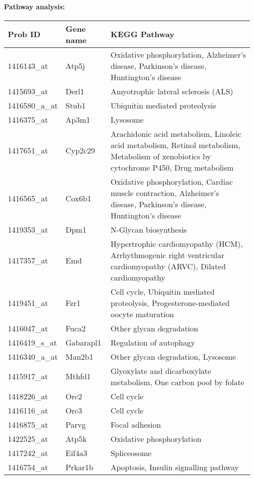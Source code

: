 \paragraph{Pathway analysis:}
\begin{table}
    \begin{tabularx}{0.99\textwidth}{ l l X }
    \toprule
	Prob ID & Gene name	& KEGG Pathway \\
    \midrule
	1416143_at &	Atp5j 	& Oxidative phosphorylation, Alzheimer's disease, Parkinson's disease, Huntington's disease\\
	1415693_at &	Derl1 	& Amyotrophic lateral sclerosis (ALS)\\
	1416580_a_at &	Stub1	& Ubiquitin mediated proteolysis\\
	1416375_at &	Ap3m1	& Lysosome\\
	1417651_at &	Cyp2c29	& Arachidonic acid metabolism, Linoleic acid metabolism, Retinol metabolism, Metabolism of xenobiotics by cytochrome P450, Drug metabolism\\
	1416565_at &	Cox6b1	& Oxidative phosphorylation, Cardiac muscle contraction, Alzheimer's disease, Parkinson's disease, Huntington's disease\\
	1419353_at &	Dpm1	& N-Glycan biosynthesis\\
	1417357_at &	Emd	& Hypertrophic cardiomyopathy (HCM), Arrhythmogenic right ventricular cardiomyopathy (ARVC), Dilated cardiomyopathy\\
	1419451_at &	Fzr1	& Cell cycle, Ubiquitin mediated proteolysis, Progesterone-mediated oocyte maturation\\
	1416047_at &	Fuca2	& Other glycan degradation\\
	1416419_s_at &	Gabarapl1	& Regulation of autophagy\\
	1416340_a_at &	Man2b1	& Other glycan degradation, Lysosome\\
	1415917_at &	Mthfd1	& Glyoxylate and dicarboxylate metabolism, One carbon pool by folate\\
	1418226_at &	Orc2	& Cell cycle\\
	1416116_at &	Orc3	& Cell cycle\\
	1416875_at &	Parvg	& Focal adhesion\\
	1422525_at &	Atp5k	& Oxidative phosphorylation\\
	1417242_at &	Eif4a3	& Spliceosome\\
	1416754_at &	Prkar1b	& Apoptosis, Insulin signalling pathway\\

\end{tabularx}
\end{table}
